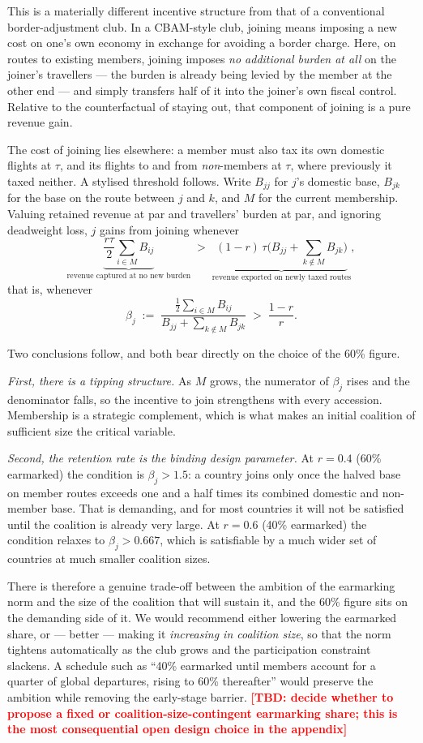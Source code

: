 \documentclass[11pt]{article}
\newcommand{\tbd}[1]{\textcolor{red}{\textbf{[TBD: #1]}}}
\begin{document}
This is a materially different incentive structure from that of a conventional
border-adjustment club. In a CBAM-style club, joining means imposing a new cost
on one's own economy in exchange for avoiding a border charge. Here, on routes to
existing members, joining imposes \emph{no additional burden at all} on the
joiner's travellers --- the burden is already being levied by the member at the
other end --- and simply transfers half of it into the joiner's own fiscal
control. Relative to the counterfactual of staying out, that component of joining
is a pure revenue gain.

The cost of joining lies elsewhere: a member must also tax its own domestic
flights at $\tau$, and its flights to and from \emph{non}-members at $\tau$,
where previously it taxed neither. A stylised threshold follows. Write $B_{jj}$
for $j$'s domestic base, $B_{jk}$ for the base on the route between $j$ and $k$,
and $M$ for the current membership. Valuing retained revenue at par and
travellers' burden at par, and ignoring deadweight loss, $j$ gains from joining
whenever
\[
\underbrace{\frac{r\tau}{2}\sum_{i \in M} B_{ij}}_{\text{revenue captured at no new burden}}
\;>\;
\underbrace{(1-r)\,\tau\Big(B_{jj} + \sum_{k \notin M} B_{jk}\Big)}_{\text{revenue exported on newly taxed routes}},
\]
that is, whenever
\[
\beta_j \;:=\; \frac{\tfrac{1}{2}\sum_{i \in M} B_{ij}}{B_{jj} + \sum_{k \notin M} B_{jk}}
\;>\; \frac{1-r}{r}.
\]

Two conclusions follow, and both bear directly on the choice of the 60\% figure.

\emph{First, there is a tipping structure.} As $M$ grows, the numerator of
$\beta_j$ rises and the denominator falls, so the incentive to join strengthens
with every accession. Membership is a strategic complement, which is what makes
an initial coalition of sufficient size the critical variable.

\emph{Second, the retention rate is the binding design parameter.} At $r = 0.4$
(60\% earmarked) the condition is $\beta_j > 1.5$: a country joins only once the
halved base on member routes exceeds one and a half times its combined domestic
and non-member base. That is demanding, and for most countries it will not be
satisfied until the coalition is already very large. At $r = 0.6$ (40\%
earmarked) the condition relaxes to $\beta_j > 0.667$, which is satisfiable by a
much wider set of countries at much smaller coalition sizes.

There is therefore a genuine trade-off between the ambition of the earmarking
norm and the size of the coalition that will sustain it, and the 60\% figure sits
on the demanding side of it. We would recommend either lowering the earmarked
share, or --- better --- making it \emph{increasing in coalition size}, so that
the norm tightens automatically as the club grows and the participation
constraint slackens. A schedule such as ``40\% earmarked until members account
for a quarter of global departures, rising to 60\% thereafter'' would preserve
the ambition while removing the early-stage barrier.
\tbd{decide whether to propose a fixed or coalition-size-contingent earmarking
share; this is the most consequential open design choice in the appendix}
\end{document}

